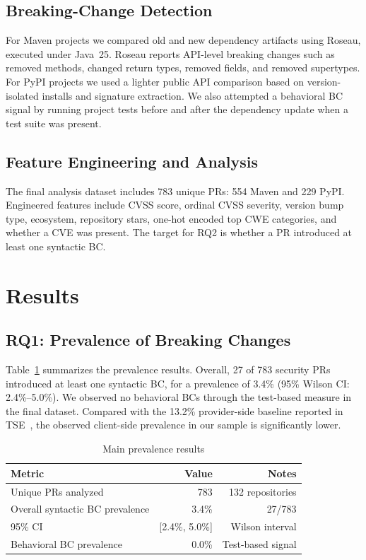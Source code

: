 \documentclass[10pt,journal]{IEEEtran}
\begin{document}
\subsection{Breaking-Change Detection}
For Maven projects we compared old and new dependency artifacts using Roseau, executed under Java~25. Roseau reports API-level breaking changes such as removed methods, changed return types, removed fields, and removed supertypes. For PyPI projects we used a lighter public API comparison based on version-isolated installs and signature extraction. We also attempted a behavioral BC signal by running project tests before and after the dependency update when a test suite was present.

\subsection{Feature Engineering and Analysis}
The final analysis dataset includes 783 unique PRs: 554 Maven and 229 PyPI. Engineered features include CVSS score, ordinal CVSS severity, version bump type, ecosystem, repository stars, one-hot encoded top CWE categories, and whether a CVE was present. The target for RQ2 is whether a PR introduced at least one syntactic BC.

\section{Results}
\subsection{RQ1: Prevalence of Breaking Changes}
Table~\ref{tab:rq1-main} summarizes the prevalence results. Overall, 27 of 783 security PRs introduced at least one syntactic BC, for a prevalence of 3.4\% (95\% Wilson CI: 2.4\%--5.0\%). We observed no behavioral BCs through the test-based measure in the final dataset. Compared with the 13.2\% provider-side baseline reported in TSE~\cite{raemaekers2021}, the observed client-side prevalence in our sample is significantly lower.

\begin{table}[t]
\caption{Main prevalence results}
\label{tab:rq1-main}
\centering
\begin{tabular}{lrr}
\toprule
Metric & Value & Notes \\
\midrule
Unique PRs analyzed & 783 & 132 repositories \\
Overall syntactic BC prevalence & 3.4\% & 27/783 \\
95\% CI & [2.4\%, 5.0\%] & Wilson interval \\
Behavioral BC prevalence & 0.0\% & Test-based signal \\
\bottomrule
\end{tabular}
\end{table}
\end{document}
